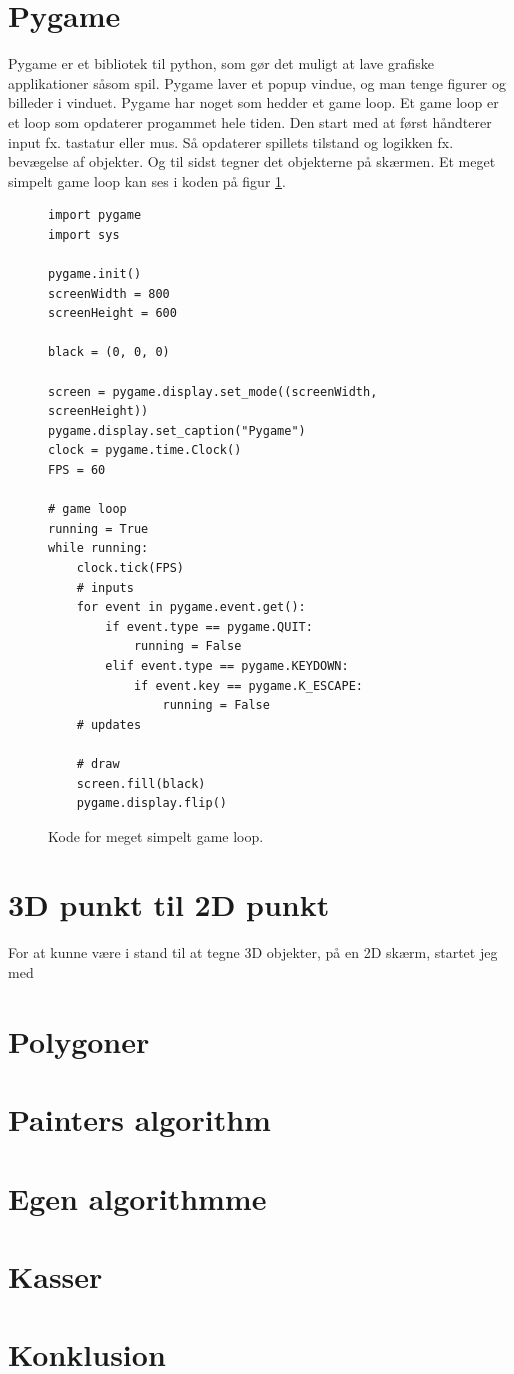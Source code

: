 \documentclass{article}
\begin{document}
\section{Pygame}
Pygame er et bibliotek til python, som gør det muligt at lave grafiske applikationer såsom spil.
Pygame laver et popup vindue, og man tenge figurer og billeder i vinduet.
Pygame har noget som hedder et game loop. Et game loop er et loop som opdaterer progammet hele tiden.
Den start med at først håndterer input fx. tastatur eller mus.
Så opdaterer spillets tilstand og logikken fx. bevægelse af objekter.
Og til sidst tegner det objekterne på skærmen.
Et meget simpelt game loop kan ses i koden på figur \ref{fig:pgkode}.

\begin{figure}[h]
\begin{verbatim}
import pygame
import sys

pygame.init()
screenWidth = 800
screenHeight = 600

black = (0, 0, 0)

screen = pygame.display.set_mode((screenWidth, screenHeight))
pygame.display.set_caption("Pygame")
clock = pygame.time.Clock()
FPS = 60

# game loop
running = True
while running:
    clock.tick(FPS)
    # inputs
    for event in pygame.event.get():
        if event.type == pygame.QUIT:
            running = False
        elif event.type == pygame.KEYDOWN:
            if event.key == pygame.K_ESCAPE:
                running = False
    # updates

    # draw
    screen.fill(black)
    pygame.display.flip()
\end{verbatim}
\caption{\label{fig:pgkode}Kode for meget simpelt game loop.}
\end{figure}

\section{3D punkt til 2D punkt}
For at kunne være i stand til at tegne 3D objekter, på en 2D skærm, 
startet jeg med  

\section{Polygoner}

\section{Painters algorithm}

\section{Egen algorithmme}

\section{Kasser}

\section{Konklusion}
\end{document}
